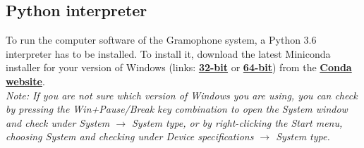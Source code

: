 \documentclass[11pt,a4paper]{article}
\newcommand{\note}[1]{\textit{Note: {#1}}}
\begin{document}
\newpage
\subsection{Python interpreter \label{sec:python_install}}
To run the computer software of the Gramophone system, a Python 3.6 interpreter has to be installed. To install it, download the latest Miniconda installer for your version of Windows
(links: 
\href{https://repo.continuum.io/miniconda/Miniconda3-latest-Windows-x86.exe}{\textbf{32-bit}}
or
\href{https://repo.continuum.io/miniconda/Miniconda3-latest-Windows-x86_64.exe}{\textbf{64-bit}}) from the \href{https://conda.io/miniconda.html}{\textbf{Conda website}}.
\\

\note{If you are not sure which version of Windows you are using, you can check by pressing the Win+Pause/Break key combination to open the System window and check under System $\rightarrow$ System type, or by right-clicking the Start menu, choosing System and checking under Device specifications $\rightarrow$ System type.}\\
\end{document}
